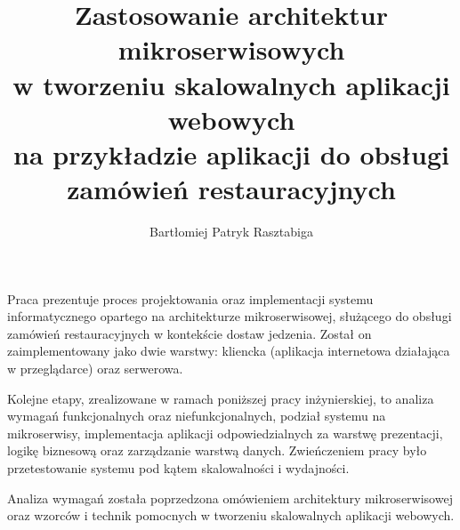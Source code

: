\documentclass[
    bindingoffset=5mm,  %
    footnoteindent=3mm, %
    hyphenation=true    %
]{src/wut-thesis}
\begin{document}

\title{
    Zastosowanie architektur mikroserwisowych\\
    w tworzeniu skalowalnych aplikacji webowych\\ 
    na przykładzie aplikacji do obsługi zamówień restauracyjnych
}
\author{Bartłomiej Patryk Rasztabiga}
\date{\the\year}
\maketitle

\cleardoublepage %
\abstract

Praca prezentuje proces projektowania oraz implementacji systemu informatycznego opartego na architekturze mikroserwisowej, służącego do obsługi zamówień restauracyjnych w kontekście dostaw jedzenia. Został on zaimplementowany jako dwie warstwy: kliencka (aplikacja internetowa działająca w przeglądarce) oraz serwerowa.

Kolejne etapy, zrealizowane w ramach poniższej pracy inżynierskiej, to analiza wymagań funkcjonalnych oraz niefunkcjonalnych, podział systemu na mikroserwisy, implementacja aplikacji odpowiedzialnych za warstwę prezentacji, logikę biznesową oraz zarządzanie warstwą danych. Zwieńczeniem pracy było przetestowanie systemu pod kątem skalowalności i wydajności.

Analiza wymagań została poprzedzona omówieniem architektury mikroserwisowej oraz wzorców i technik pomocnych w tworzeniu skalowalnych aplikacji webowych.
\end{document}
